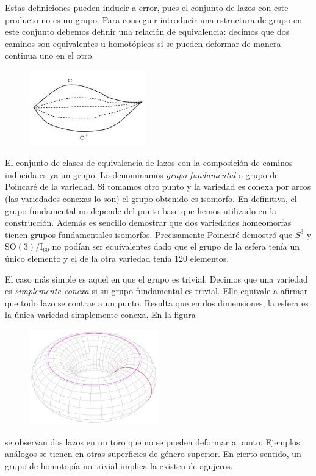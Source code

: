 \documentclass[a4paper, 12pt]{article}
\begin{document}
 Estas definiciones pueden inducir a error, pues el conjunto de lazos con este producto no es un grupo.  Para conseguir introducir una estructura de grupo en este conjunto debemos definir una relación de equivalencia: decimos que dos caminos son equivalentes u homotópicos si se pueden deformar de manera continua uno en el otro. 
 
 
\begin{figure}[htbp]
	\centering
		\includegraphics[width=0.45\textwidth]{imagenes/homotopiacaminosconextremos.jpg}
	\label{fig:homotopiacaminosconextremos}
\end{figure}

  El conjunto de clases de equivalencia de lazos con la composición de caminos inducida es ya un grupo.  Lo denominamos {\it grupo fundamental} o grupo de Poincaré de la variedad.  Si tomamos otro punto y la variedad es conexa por arcos (las variedades conexas lo son) el grupo obtenido es isomorfo.  En definitiva, el grupo fundamental no depende del punto base que hemos utilizado en la construcción. Además es sencillo demostrar que dos variedades homeomorfas tienen grupos fundamentales isomorfos.   Precisamente Poincaré demostró que $S^3$ y $\mathrm{SO}(3)/\mathrm{I}_{60}$ no podían ser equivalentes dado que el grupo de la esfera tenía un único elemento y el de la otra variedad tenía 120 elementos.
 
  El caso más simple es aquel en que el grupo es trivial.  Decimos que una variedad es {\it simplemente conexa} si su grupo fundamental es trivial. Ello equivale a afirmar que todo lazo se contrae a un punto. Resulta que en dos dimensiones, la esfera es la única variedad simplemente conexa.  En la figura 
\begin{figure}[h]
	\centering
		\includegraphics[width=0.50\textwidth]{imagenes/toro.jpg}
	\label{fig:toro}
\end{figure}
se observan dos lazos en un toro que no se pueden deformar a punto. Ejemplos análogos se tienen en otras superficies de género superior.  En cierto sentido, un grupo de  homotopía no trivial implica la existen de agujeros.
\end{document}
